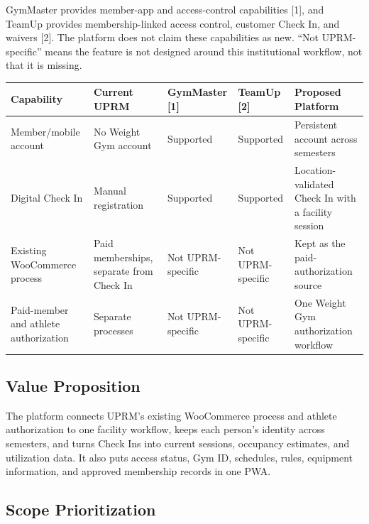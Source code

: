 GymMaster provides member-app and access-control capabilities [1], and TeamUp provides membership-linked access control, customer Check In, and waivers [2]. The platform does not claim these capabilities as new. ``Not UPRM-specific'' means the feature is not designed around this institutional workflow, not that it is missing.

\begin{center}
\small
\begin{tabularx}{0.98\textwidth}{L{2.8cm} L{2.8cm} L{2.2cm} L{2.2cm} X}
\toprule
\textbf{Capability} &
\textbf{Current UPRM} &
\textbf{GymMaster [1]} &
\textbf{TeamUp [2]} &
\textbf{Proposed Platform} \\
\midrule

Member/mobile account
&
No Weight Gym account
&
Supported
&
Supported
&
Persistent account across semesters \\

\addlinespace

Digital Check In
&
Manual registration
&
Supported
&
Supported
&
Location-validated Check In with a facility session \\

\addlinespace

Existing WooCommerce process
&
Paid memberships, separate from Check In
&
Not UPRM-specific
&
Not UPRM-specific
&
Kept as the paid-authorization source \\

\addlinespace

Paid-member and athlete authorization
&
Separate processes
&
Not UPRM-specific
&
Not UPRM-specific
&
One Weight Gym authorization workflow \\

\bottomrule
\end{tabularx}
\end{center}


\subsection{Value Proposition}

The platform connects UPRM's existing WooCommerce process and athlete authorization to one facility workflow, keeps each person's identity across semesters, and turns Check Ins into current sessions, occupancy estimates, and utilization data. It also puts access status, Gym ID, schedules, rules, equipment information, and approved membership records in one PWA.

\subsection{Scope Prioritization}

